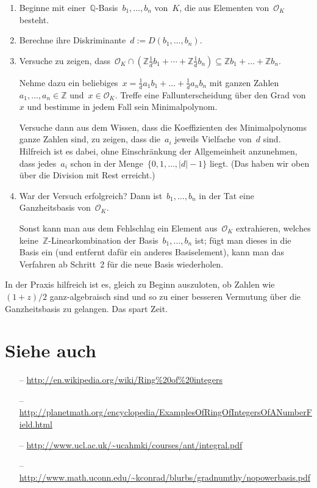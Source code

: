 \documentclass[12pt,a4paper,ngerman]{scrartcl}
\newcommand{\Q}{\mathbb{Q}}
\newcommand{\Z}{\mathbb{Z}}
\theoremstyle{definition}
\theoremstyle{plain}
\theoremstyle{remark}
\begin{document}
\begin{enumerate}
\item Beginne mit einer~$\Q$-Basis~$b_1,\ldots,b_n$ von~$K$, die aus Elementen
von~$\mathcal{O}_K$ besteht.
\item Berechne ihre Diskriminante~$d := D(b_1,\ldots,b_n)$.
\item Versuche zu zeigen, dass~$\mathcal{O}_K \cap \left(\Z \frac{1}{d}b_1
+ \cdots + \Z \frac{1}{d}b_n\right) \subseteq \Z b_1 + \ldots + \Z b_n$.

Nehme dazu ein beliebiges~$x = \frac{1}{d}a_1b_1 + \ldots + \frac{1}{d}a_nb_n$
mit ganzen Zahlen~$a_1,\ldots,a_n \in \Z$ und~$x \in \mathcal{O}_K$. Treffe
eine Fallunterscheidung über den Grad von~$x$ und bestimme in jedem Fall sein
Minimalpolynom.

Versuche dann aus dem Wissen, dass die Koeffizienten des Minimalpolynoms ganze
Zahlen sind, zu zeigen, dass die~$a_i$ jeweils Vielfache von~$d$ sind.
Hilfreich ist es dabei, ohne Einschränkung der Allgemeinheit anzunehmen, dass
jedes~$a_i$ schon in der Menge~$\{ 0,1,\ldots,|d|-1 \}$ liegt. (Das haben wir
oben über die Division mit Rest erreicht.)
\item War der Versuch erfolgreich? Dann ist~$b_1,\ldots,b_n$ in der Tat eine
Ganzheitsbasis von~$\mathcal{O}_K$.

Sonst kann man aus dem Fehlschlag ein Element aus~$\mathcal{O}_K$ extrahieren,
welches keine~$\Z$-Linearkombination der Basis~$b_1,\ldots,b_n$ ist; fügt man
dieses in die Basis ein (und entfernt dafür ein anderes Basiselement), kann man
das Verfahren ab Schritt~2 für die neue Basis wiederholen.
\end{enumerate}

In der Praxis hilfreich ist es, gleich zu Beginn auszuloten, ob Zahlen wie
$(1+z)/2$ ganz-algebraisch sind und so zu einer besseren
Vermutung über die Ganzheitsbasis zu gelangen. Das spart Zeit.


\section*{Siehe auch}

\begin{itemize}
\item[--] \url{http://en.wikipedia.org/wiki/Ring%20of%20integers}
\item[--]
\url{http://planetmath.org/encyclopedia/ExamplesOfRingOfIntegersOfANumberField.html}
\item[--] \url{http://www.ucl.ac.uk/~ucahmki/courses/ant/integral.pdf}
\item[--]
\url{http://www.math.uconn.edu/~kconrad/blurbs/gradnumthy/nopowerbasis.pdf}
\end{itemize}
\end{document}
